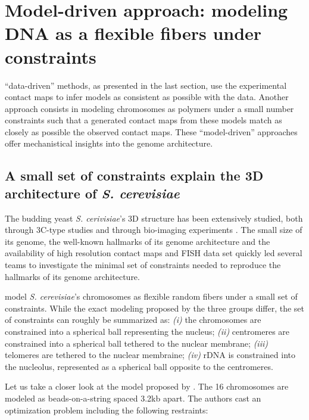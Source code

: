 \documentclass[letterpaper,12pt]{article}
\begin{document}
\section*{Model-driven approach: modeling DNA as a flexible fibers under constraints}

``data-driven'' methods, as presented in the last section, use the
experimental contact maps to infer models as consistent as possible with the
data. Another approach consists in modeling chromosomes as polymers under a
small number constraints such that a generated contact maps from these models
match as closely as possible the observed contact maps. These ``model-driven''
approaches offer mechanistical insights into the genome architecture.


\subsection*{A small set of constraints explain the 3D architecture of \textit{S. cerevisiae}}

The budding yeast \textit{S. cerivisiae}'s 3D structure has been extensively
studied, both through 3C-type studies \citep{dekker:capturing,
duan:three-dimensional, burton:species-level} and through bio-imaging experiments
\citep{berger:high}. The small size of its genome, the well-known hallmarks of its
genome architecture and the availability of high resolution contact maps and
FISH data set quickly led several teams to investigate the minimal set of
constraints needed to reproduce the hallmarks of its genome architecture.

\cite{tjong:physical, tokuda:dynamical, tjong:physical} model {\em S.
cerevisiae}'s chromosomes as flexible random fibers under a small set of
constraints. While the exact modeling proposed by the three groups differ, the
set of constraints can roughly be summarized as: \textit{(i)} the chromosomes
are constrained into a spherical ball representing the nucleus; \textit{(ii)}
centromeres are constrained into a spherical ball tethered to the nuclear
membrane; \textit{(iii)} telomeres are tethered to the nuclear membraine;
\textit{(iv)} rDNA is constrained into the nucleolus, represented as a
spherical ball opposite to the centromeres.

Let us take a closer look at the model proposed by \citet{tjong:physical}.
The 16 chromosomes are modeled as beads-on-a-string spaced 3.2kb apart. The
authors cast an optimization problem including the following restraints: 
\end{document}
